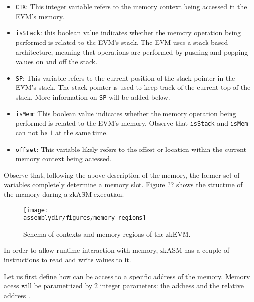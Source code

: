 \begin{itemize}
    
    \item \texttt{CTX}: This integer variable refers to the memory context being accessed in the EVM's memory. 
    
    \item \texttt{isStack}:  this boolean value indicates whether the memory operation being performed is related to the EVM's stack. The EVM uses a stack-based architecture, meaning that operations are performed by pushing and popping values on and off the stack.
    
    \item \texttt{SP}: This variable refers to the current position of the stack pointer in the EVM's stack. The stack pointer is used to keep track of the current top of the stack. More information on \texttt{SP} will be added below.
    
    \item \texttt{isMem}: This boolean value indicates whether the memory operation being performed is related to the EVM's memory. Observe that \texttt{isStack} and \texttt{isMem} can not be $1$ at the same time. 
    
    \item \texttt{offset}:  This variable likely refers to the offset or location within the current memory context being accessed.
    
\end{itemize}

Observe that, following the above description of the memory, the former set of variables completely determine a memory slot. Figure ?? shows the structure of the memory during a zkASM execution.

\begin{figure}[H]
    \centering
    \texttt{[image: \\assemblydir/figures/memory-regions]}
    \caption{Schema of contexts and memory regions of the zkEVM.}
    \label{fig:memory-regions}
\end{figure}

In order to allow runtime interaction with memory, zkASM has a couple of instructions to read and write values to it.



Let us first define how can be access to a specific address of the memory. Memory acess will be parametrized by $2$ integer parameters: the address \addr and the relative address \relAddr. 

